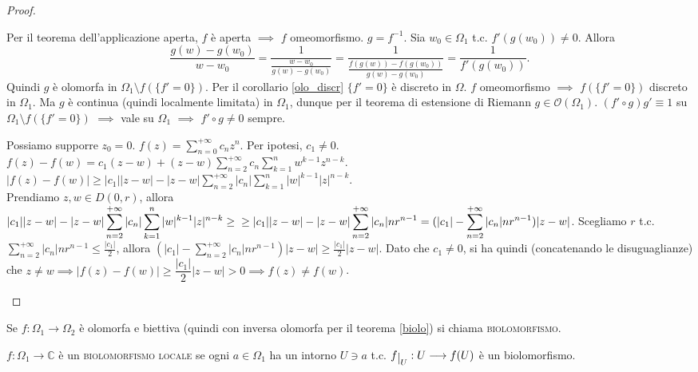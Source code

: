 \begin{proof}
  \begin{nlist}
    \item Per il teorema dell'applicazione aperta, $f$ è aperta $\implies$ $f$ omeomorfismo. $g=f^{-1}$. Sia $w_0 \in \Omega_1$ t.c. $f'(g(w_0)) \not=0$. Allora
    $$ \frac{g(w)-g(w_0)}{w-w_0}=\frac{1}{\frac{w-w_0}{g(w)-g(w_0)}}=\frac{1}{\frac{f(g(w))-f(g(w_0))}{g(w)-g(w_0)}}=\frac{1}{f'(g(w_0))}. $$
    Quindi $g$ è olomorfa in $\Omega_1 \setminus f(\{f'=0\})$. Per il corollario \ref{olo_discr} $\{f'=0\}$ è discreto in $\Omega$. $f$ omeomorfismo $\implies$ $f(\{f'=0\})$ discreto in $\Omega_1$.
    Ma $g$ è continua (quindi localmente limitata) in $\Omega_1$, dunque per il teorema di estensione di Riemann $g \in \mathcal{O}(\Omega_1)$. $(f' \circ g)g' \equiv 1$ su $\Omega_1 \setminus f(\{f'=0\})$ $\implies$ vale su $\Omega_1$ $\implies$ $f'\circ g \not=0$ sempre.
    \item Possiamo supporre $z_0=0$. $\displaystyle f(z)=\sum_{n=0}^{+\infty} c_nz^n$. Per ipotesi, $c_1 \not=0$. \\
    $\displaystyle f(z)-f(w)=c_1(z-w)+(z-w)\sum_{n=2}^{+\infty} c_n\sum_{k=1}^n w^{k-1}z^{n-k}$. \\
    $\displaystyle |f(z)-f(w)| \ge |c_1||z-w|-|z-w|\sum_{n=2}^{+\infty} |c_n|\sum_{k=1}^n |w|^{k-1}|z|^{n-k}$. \\
    Prendiamo $z, w \in D(0, r)$, allora \\
    $\displaystyle |c_1||z-w|-|z-w|\sum_{n=2}^{+\infty} |c_n|\sum_{k=1}^n |w|^{k-1}|z|^{n-k} \ge \\
    \ge |c_1||z-w|-|z-w|\sum_{n=2}^{+\infty} |c_n|nr^{n-1}=(|c_1|-\sum_{n=2}^{+\infty} |c_n|nr^{n-1})|z-w|$.
    Scegliamo $r$ t.c. $\displaystyle \sum_{n=2}^{+\infty} |c_n|nr^{n-1} \le \frac{|c_1|}{2}$, allora $\displaystyle (|c_1|-\sum_{n=2}^{+\infty} |c_n|nr^{n-1})|z-w| \ge \frac{|c_1|}{2}|z-w|$.
    Dato che $c_1 \not=0$, si ha quindi (concatenando le disuguaglianze) che $z \not=w \implies |f(z)-f(w)| \ge \dfrac{|c_1|}{2}|z-w|>0 \implies f(z) \not= f(w)$.
  \end{nlist}
\end{proof}

\begin{defn}
  Se $f: \Omega_1 \longrightarrow \Omega_2$ è olomorfa e biettiva (quindi con inversa olomorfa per il teorema \ref{biolo}) si chiama \textsc{biolomorfismo}.
\end{defn}

\begin{defn}
  $f:\Omega_1 \longrightarrow \mathbb{C}$ è un \textsc{biolomorfismo locale} se ogni $a \in \Omega_1$ ha un intorno $U \ni a$ t.c. $f\restrict{U}:U \longrightarrow f(U)$ è un biolomorfismo.
\end{defn}

